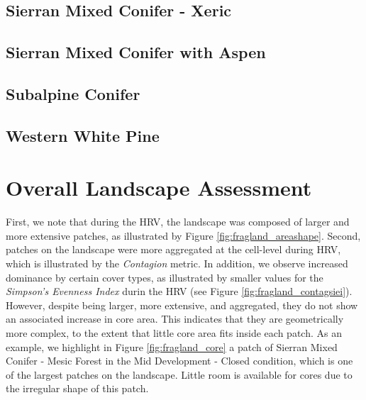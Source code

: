 \subsection{Sierran Mixed Conifer - Xeric} 
\subsection{Sierran Mixed Conifer with Aspen} 
\subsection{Subalpine Conifer} 
\subsection{Western White Pine} 



\section{Overall Landscape Assessment}

First, we note that during the HRV, the landscape was composed of larger and more extensive patches, as illustrated by Figure \ref{fig:fragland_areashape}. 
Second, patches on the landscape were more aggregated at the cell-level during HRV, which is illustrated by the \emph{Contagion} metric. In addition, we observe increased dominance by certain cover types, as illustrated by smaller values for the \emph{Simpson's Evenness Index} durin the HRV (see Figure \ref{fig:fragland_contagsiei}). However, despite being larger, more extensive, and aggregated, they do not show an associated increase in core area. This indicates that they are geometrically more complex, to the extent that little core area fits inside each patch. As an example, we highlight in Figure \ref{fig:fragland_core} a patch of Sierran Mixed Conifer - Mesic Forest in the Mid Development - Closed condition, which is one of the largest patches on the landscape. Little room is available for cores due to the irregular shape of this patch.
